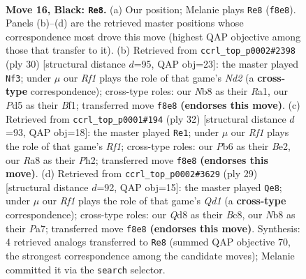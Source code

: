\documentclass[11pt]{article}
\begin{document}
\clearpage

\begin{figure}[p]\centering
\begin{subfigure}{0.46\textwidth}\centering
\resizebox{\linewidth}{!}{%
\newchessgame
\chessboard[
  setfen={rnbq1rk1/p3b2p/1pp3pP/3p1pP1/P2P1P2/1P2P3/4N3/R2QKBNR b KQ - 2 16},
  showmover=false,
  pgfstyle=straightmove, color=movearrow, markmove={f8-e8}
]}
\caption{}
\end{subfigure}\hfill
\begin{subfigure}{0.46\textwidth}\centering
\resizebox{\linewidth}{!}{%
\newchessgame
\chessboard[
  setfen={2rqr1k1/5pbp/p1nppnp1/1pp5/4P3/P1PPB1PP/1P1NQP2/R3RBK1 w - - 1 16},
  showmover=false,
  pgfstyle=straightmove, color=movearrow, markmove={d2-f3}
]}
\caption{}
\end{subfigure}
\\[4pt]
\begin{subfigure}{0.46\textwidth}\centering
\resizebox{\linewidth}{!}{%
\newchessgame
\chessboard[
  setfen={r1b2rk1/1p2q1pp/2pp1nn1/p4p2/2PP4/PP1NB1P1/4BP1P/R2Q1RK1 w - - 6 17},
  showmover=false,
  pgfstyle=straightmove, color=movearrow, markmove={f1-e1}
]}
\caption{}
\end{subfigure}\hfill
\begin{subfigure}{0.46\textwidth}\centering
\resizebox{\linewidth}{!}{%
\newchessgame
\chessboard[
  setfen={r1bq2k1/pp4b1/2ppnrpp/5p2/PPPPpN1P/4P1P1/4NP2/R2QKB1R b KQ - 2 15},
  showmover=false,
  pgfstyle=straightmove, color=movearrow, markmove={d8-e8}
]}
\caption{}
\end{subfigure}
\caption{\textbf{Move 16, Black: \texttt{Re8}.} (a) Our position; Melanie plays \texttt{Re8} (\texttt{f8e8}). Panels (b)--(d) are the retrieved master positions whose correspondence most drove this move (highest QAP objective among those that transfer to it). (b) Retrieved from \texttt{ccrl\_top\_p0002\#2398} (ply 30) [structural distance $d$=95, QAP obj=23]: the master played \texttt{Nf3}; under $\mu$ our \emph{Rf1} plays the role of that game's \emph{Nd2} (a \textbf{cross-type} correspondence); cross-type roles: our \emph{N}b8 as their \emph{R}a1, our \emph{P}d5 as their \emph{B}f1; transferred move \texttt{f8e8} \textbf{(endorses this move)}. (c) Retrieved from \texttt{ccrl\_top\_p0001\#194} (ply 32) [structural distance $d$=93, QAP obj=18]: the master played \texttt{Re1}; under $\mu$ our \emph{Rf1} plays the role of that game's \emph{Rf1}; cross-type roles: our \emph{P}b6 as their \emph{B}e2, our \emph{R}a8 as their \emph{P}h2; transferred move \texttt{f8e8} \textbf{(endorses this move)}. (d) Retrieved from \texttt{ccrl\_top\_p0002\#3629} (ply 29) [structural distance $d$=92, QAP obj=15]: the master played \texttt{Qe8}; under $\mu$ our \emph{Rf1} plays the role of that game's \emph{Qd1} (a \textbf{cross-type} correspondence); cross-type roles: our \emph{Q}d8 as their \emph{B}c8, our \emph{N}b8 as their \emph{P}a7; transferred move \texttt{f8e8} \textbf{(endorses this move)}. Synthesis: 4 retrieved analogs transferred to \texttt{Re8} (summed QAP objective 70, the strongest correspondence among the candidate moves); Melanie committed it via the \texttt{search} selector.}
\label{fig:thought-m31}
\end{figure}
\end{document}
